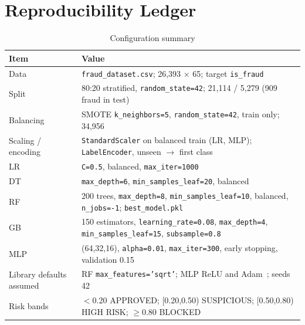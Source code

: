 \documentclass[conference]{IEEEtran}
\newcommand{\tabfont}{\footnotesize}
\begin{document}
\section{Reproducibility Ledger}
\begin{table}[H]
\caption{Configuration summary}\label{tab:ledger}
\centering\tabfont
\begin{tabularx}{\columnwidth}{@{}l Y@{}}
\toprule
\textbf{Item} & \textbf{Value}\\
\midrule
Data & \texttt{fraud\_\allowbreak{}dataset.csv}; 26,393 $\times$ 65; target \texttt{is\_\allowbreak{}fraud}\\
Split & 80:20 stratified, \texttt{random\_\allowbreak{}state=42}; 21,114 / 5,279 (909 fraud in test)\\
Balancing & SMOTE \texttt{k\_\allowbreak{}neighbors=5}, \texttt{random\_\allowbreak{}state=42}, train only; 34,956\\
Scaling / encoding & \texttt{StandardScaler} on balanced train (LR, MLP); \texttt{LabelEncoder}, unseen $\rightarrow$ first class\\
LR & \texttt{C=0.5}, balanced, \texttt{max\_\allowbreak{}iter=1000}\\
DT & \texttt{max\_\allowbreak{}depth=6}, \texttt{min\_\allowbreak{}samples\_\allowbreak{}leaf=20}, balanced\\
RF & 200 trees, \texttt{max\_\allowbreak{}depth=8}, \texttt{min\_\allowbreak{}samples\_\allowbreak{}leaf=10}, balanced, \texttt{n\_\allowbreak{}jobs=-1}; \texttt{best\_\allowbreak{}model.pkl}\\
GB & 150 estimators, \texttt{learning\_\allowbreak{}rate=0.08}, \texttt{max\_\allowbreak{}depth=4}, \texttt{min\_\allowbreak{}samples\_\allowbreak{}leaf=15}, \texttt{subsample=0.8}\\
MLP & (64,32,16), \texttt{alpha=0.01}, \texttt{max\_\allowbreak{}iter=300}, early stopping, validation 0.15\\
Library defaults assumed & RF \texttt{max\_\allowbreak{}features='sqrt'}; MLP ReLU and Adam~\cite{kingma15}; seeds 42\\
Risk bands & $<$0.20 APPROVED; [0.20,0.50) SUSPICIOUS; [0.50,0.80) HIGH RISK; $\ge$0.80 BLOCKED\\
\bottomrule
\end{tabularx}
\end{table}

\balance
\end{document}
